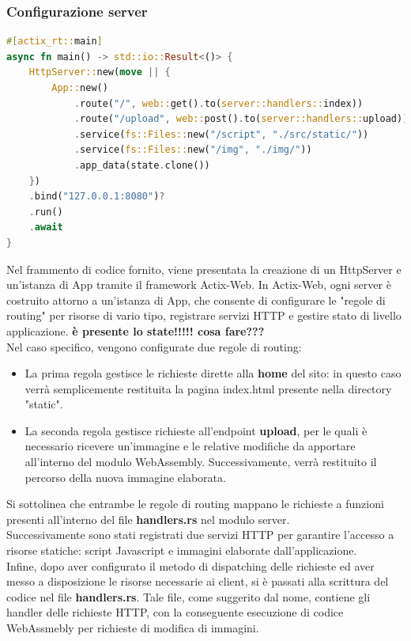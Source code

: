 \subsubsection{Configurazione server}

\begin{lstlisting}[language=rust, label=lst:RustWasi, caption={Porzione del file main.rs}, showstringspaces=false]
#[actix_rt::main]
async fn main() -> std::io::Result<()> {
    HttpServer::new(move || {
        App::new()
            .route("/", web::get().to(server::handlers::index))
            .route("/upload", web::post().to(server::handlers::upload))
            .service(fs::Files::new("/script", "./src/static/"))
            .service(fs::Files::new("/img", "./img/"))
            .app_data(state.clone())
    })
    .bind("127.0.0.1:8080")?
    .run()
    .await
}
\end{lstlisting}
Nel frammento di codice fornito, viene presentata la creazione di un HttpServer e un'istanza di App tramite il framework Actix-Web.
In Actix-Web, ogni server è costruito attorno a un'istanza di App, che consente di configurare le "regole di routing" per risorse di vario tipo, registrare servizi HTTP e gestire stato di livello applicazione.
\textbf{è presente lo state!!!!! cosa fare???}
\\Nel caso specifico, vengono configurate due regole di routing:
\begin{itemize}
    \item La prima regola gestisce le richieste dirette alla \textbf{home} del sito: in questo caso verrà semplicemente restituita la pagina index.html presente nella directory "static".
    \item La seconda regola gestisce richieste all'endpoint \textbf{upload}, per le quali è necessario ricevere un'immagine e le relative modifiche da apportare all'interno del modulo WebAssembly. Successivamente, verrà restituito il percorso della nuova immagine elaborata.
\end{itemize}
Si sottolinea che entrambe le regole di routing mappano le richieste a funzioni presenti all'interno del file \textbf{handlers.rs} nel modulo server.
\\Successivamente sono stati registrati due servizi HTTP  per garantire l'accesso a risorse statiche: script Javascript e immagini elaborate dall'applicazione.
\\Infine, dopo aver configurato il metodo di dispatching delle richieste ed aver messo a disposizione le risorse necessarie ai client, si è passati alla scrittura del codice nel file \textbf{handlers.rs}. Tale file, come suggerito dal nome, contiene gli handler delle richieste HTTP, con la conseguente esecuzione di codice WebAssmebly per richieste di modifica di immagini.

